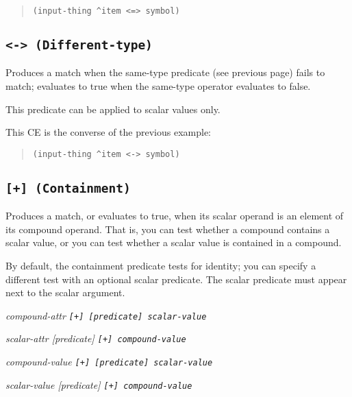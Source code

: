 \begin{quote}
\begin{verbatim}
(input-thing ^item <=> symbol)
\end{verbatim}
\end{quote}

\subsection{\tt{<->} (Different-type)}

Produces a match when the same-type predicate (see previous page)
fails to match; evaluates to true when the same-type operator
evaluates to false.

This predicate can be applied to scalar values only.

\Example

This CE is the converse of the previous example:

\begin{quote}
\begin{verbatim}
(input-thing ^item <-> symbol)
\end{verbatim}
\end{quote}

\subsection{\tt{[+]} (Containment)}

Produces a match, or evaluates to true, when its scalar operand is an
element of its compound operand. That is, you can test whether a
compound contains a scalar value, or you can test whether a scalar
value is contained in a compound.

By default, the containment predicate tests for identity; you can
specify a different test with an optional scalar predicate. The scalar
predicate must appear next to the scalar argument.

\Format

\ct\it{compound-attr} \tt{[+]} [\it{predicate}] \it{scalar-value}

\ct\it{scalar-attr} [\it{predicate}] \tt{[+]} \it{compound-value}

\it{compound-value} \tt{[+]} [\it{predicate}] \it{scalar-value}

\it{scalar-value} [\it{predicate}] \tt{[+]} \it{compound-value}

